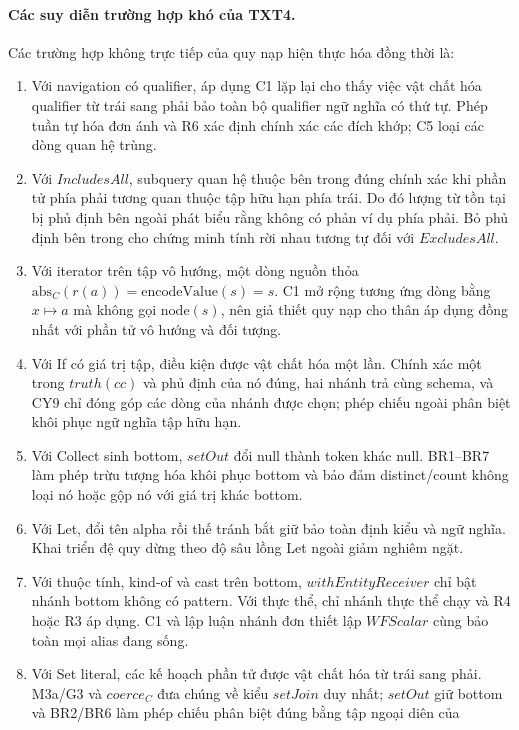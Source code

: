 \documentclass[11pt,a4paper]{article}
\theoremstyle{definition}
\newcommand{\node}{\mathrm{node}}
\newcommand{\encodeValue}{\mathrm{encodeValue}}
\newcommand{\absC}{\mathrm{abs}_{C}}
\begin{document}
\paragraph{Các suy diễn trường hợp khó của TXT4.}
Các trường hợp không trực tiếp của quy nạp hiện thực hóa đồng thời là:
\begin{enumerate}[label=(D\arabic*)]
  \item Với navigation có qualifier, áp dụng C1 lặp lại cho thấy việc vật chất
  hóa qualifier từ trái sang phải bảo toàn bộ qualifier ngữ nghĩa có thứ tự.
  Phép tuần tự hóa đơn ánh và R6 xác định chính xác các đích khớp; C5 loại các
  dòng quan hệ trùng.
  \item Với $IncludesAll$, subquery quan hệ thuộc bên trong đúng chính xác khi
  phần tử phía phải tương quan thuộc tập hữu hạn phía trái. Do đó lượng từ tồn
  tại bị phủ định bên ngoài phát biểu rằng không có phản ví dụ phía phải. Bỏ
  phủ định bên trong cho chứng minh tính rời nhau tương tự đối với $ExcludesAll$.
  \item Với iterator trên tập vô hướng, một dòng nguồn thỏa
  $\absC(r(a))=\encodeValue(s)=s$. C1 mở rộng tương ứng dòng bằng
  $x\mapsto a$ mà không gọi $\node(s)$, nên giả thiết quy nạp cho thân áp dụng
  đồng nhất với phần tử vô hướng và đối tượng.
  \item Với If có giá trị tập, điều kiện được vật chất hóa một lần. Chính xác
  một trong $truth(cc)$ và phủ định của nó đúng, hai nhánh trả cùng schema, và
  CY9 chỉ đóng góp các dòng của nhánh được chọn; phép chiếu ngoài phân biệt khôi
  phục ngữ nghĩa tập hữu hạn.
  \item Với Collect sinh bottom, $setOut$ đổi null thành token khác null.
  BR1--BR7 làm phép trừu tượng hóa khôi phục bottom và bảo đảm distinct/count
  không loại nó hoặc gộp nó với giá trị khác bottom.
  \item Với Let, đổi tên alpha rồi thế tránh bắt giữ bảo toàn định kiểu và ngữ
  nghĩa. Khai triển đệ quy dừng theo độ sâu lồng Let ngoài giảm nghiêm ngặt.
  \item Với thuộc tính, kind-of và cast trên bottom, $withEntityReceiver$ chỉ
  bật nhánh bottom không có pattern. Với thực thể, chỉ nhánh thực thể chạy và
  R4 hoặc R3 áp dụng. C1 và lập luận nhánh đơn thiết lập $WFScalar$ cùng bảo
  toàn mọi alias đang sống.
  \item Với Set literal, các kế hoạch phần tử được vật chất hóa từ trái sang
  phải. M3a/G3 và $coerce_C$ đưa chúng về kiểu $setJoin$ duy nhất; $setOut$
  giữ bottom và BR2/BR6 làm phép chiếu phân biệt đúng bằng tập ngoại diên của

\end{enumerate}
\end{document}
